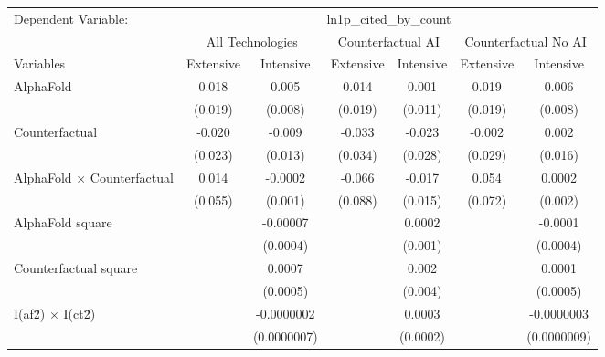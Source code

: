 \begingroup
\centering
\begin{tabular}{lcccccc}
   \tabularnewline \midrule \midrule
   Dependent Variable: & \multicolumn{6}{c}{ln1p\_cited\_by\_count}\\
 & \multicolumn{2}{c}{All Technologies} & \multicolumn{2}{c}{Counterfactual AI} & \multicolumn{2}{c}{Counterfactual No AI} \\
\cmidrule(lr){1-1}\cmidrule(lr){2-3} \cmidrule(lr){4-5} \cmidrule(lr){6-7}
Variables & \multicolumn{1}{c}{Extensive} & \multicolumn{1}{c}{Intensive} & \multicolumn{1}{c}{Extensive} & \multicolumn{1}{c}{Intensive} & \multicolumn{1}{c}{Extensive} & \multicolumn{1}{c}{Intensive} \\
\cmidrule(lr){1-1}\cmidrule(lr){2-2} \cmidrule(lr){3-3} \cmidrule(lr){4-4} \cmidrule(lr){5-5} \cmidrule(lr){6-6} \cmidrule(lr){7-7}
   AlphaFold                          & 0.018   & 0.005       & 0.014   & 0.001    & 0.019   & 0.006\\   
                                      & (0.019) & (0.008)     & (0.019) & (0.011)  & (0.019) & (0.008)\\   
   Counterfactual                     & -0.020  & -0.009      & -0.033  & -0.023   & -0.002  & 0.002\\   
                                      & (0.023) & (0.013)     & (0.034) & (0.028)  & (0.029) & (0.016)\\   
   AlphaFold $\times$ Counterfactual  & 0.014   & -0.0002     & -0.066  & -0.017   & 0.054   & 0.0002\\   
                                      & (0.055) & (0.001)     & (0.088) & (0.015)  & (0.072) & (0.002)\\   
   AlphaFold square                   &         & -0.00007    &         & 0.0002   &         & -0.0001\\   
                                      &         & (0.0004)    &         & (0.001)  &         & (0.0004)\\   
   Counterfactual square              &         & 0.0007      &         & 0.002    &         & 0.0001\\   
                                      &         & (0.0005)    &         & (0.004)  &         & (0.0005)\\   
   I(af\^2) $\times$ I(ct\^2)         &         & -0.0000002  &         & 0.0003   &         & -0.0000003\\   
                                      &         & (0.0000007) &         & (0.0002) &         & (0.0000009)\\   

\end{tabular}

